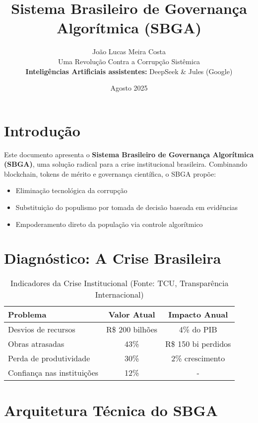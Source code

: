 \documentclass[12pt, a4paper]{article}
\title{\bfseries Sistema Brasileiro de Governança Algorítmica (SBGA)}
\author{
João Lucas Meira Costa \\
{\large Uma Revolução Contra a Corrupção Sistêmica} \\
\small \textbf{Inteligências Artificiais assistentes:} DeepSeek \& Jules (Google)
}
\date{Agosto 2025}
\begin{document}
\maketitle

\tableofcontents

\section{Introdução}
Este documento apresenta o \textbf{Sistema Brasileiro de Governança Algorítmica (SBGA)}, uma solução radical para a crise institucional brasileira. Combinando blockchain, tokens de mérito e governança científica, o SBGA propõe:

\begin{itemize}
    \item Eliminação tecnológica da corrupção
    \item Substituição do populismo por tomada de decisão baseada em evidências
    \item Empoderamento direto da população via controle algorítmico
\end{itemize}

\section{Diagnóstico: A Crise Brasileira}
\begin{table}[h]
\centering
\caption{Indicadores da Crise Institucional (Fonte: TCU, Transparência Internacional)}
\begin{tabular}{lcc}
\toprule
\textbf{Problema} & \textbf{Valor Atual} & \textbf{Impacto Anual} \\
\midrule
Desvios de recursos & R\$ 200 bilhões & 4\% do PIB \\
Obras atrasadas & 43\% & R\$ 150 bi perdidos \\
Perda de produtividade & 30\% & 2\% crescimento \\
Confiança nas instituições & 12\% & - \\
\bottomrule
\end{tabular}
\end{table}

\section{Arquitetura Técnica do SBGA}
\end{document}
